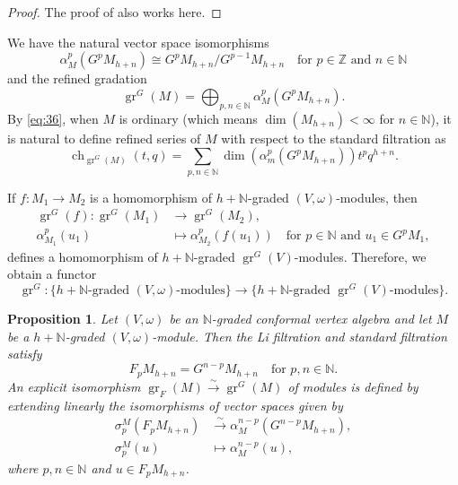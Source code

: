 \documentclass[a4paper, 12pt, reqno]{amsart}
\newtheorem{proposition}[theorem]{Proposition}
\theoremstyle{remark}
\numberwithin{equation}{subsection}
\DeclareMathOperator{\gr}{gr}
\DeclareMathOperator{\ch}{ch}
\begin{document}
\begin{proof}
  The proof of  also works here.
\end{proof}

We have the natural vector space isomorphisms
\begin{equation*}
  \alpha_M^p(G^pM_{h + n}) \cong G^pM_{h + n}/G^{p - 1}M_{h + n} \quad \text{for }p \in \mathbb{Z}\text{ and }n \in \mathbb{N}
\end{equation*}
and the refined gradation
\begin{equation}
  \label{eq:36}
  \gr^G(M) = \bigoplus_{p, n \in \mathbb{N}}\alpha_M^p(G^pM_{h + n}).
\end{equation}
By \eqref{eq:36}, when $M$ is ordinary (which means $\dim(M_{h + n}) < \infty$ for $n \in \mathbb{N}$), it is natural to define refined series of $M$ with respect to the standard filtration as
\begin{equation*}
  \ch_{\gr^G(M)}(t, q) = \sum_{p, n \in \mathbb{N}}\dim(\alpha_m^p(G^pM_{h + n}))t^pq^{h + n}.
\end{equation*}

If $f: M_1 \to M_2$ is a homomorphism of $h + \mathbb{N}$-graded $(V, \omega)$-modules, then
\begin{align*}
  \gr^G(f): \gr^G(M_1) &\to \gr^G(M_2), \\
  \alpha^p_{M_1}(u_1) &\mapsto \alpha^p_{M_2}(f(u_1)) \quad \text{for }p \in \mathbb{N}\text{ and }u_1 \in G^pM_1,
\end{align*}
defines a homomorphism of $h + \mathbb{N}$-graded $\gr^G(V)$-modules.
Therefore, we obtain a functor
\begin{equation*}
  \gr^G: \{\text{$h + \mathbb{N}$-graded $(V, \omega)$-modules}\} \to \{\text{$h + \mathbb{N}$-graded $\gr^G(V)$-modules}\}.
\end{equation*}

\begin{proposition}
  \label{prp:14}
  Let $(V, \omega)$ be an $\mathbb{N}$-graded conformal vertex algebra and let $M$ be a $h + \mathbb{N}$-graded $(V, \omega)$-module.
  Then the Li filtration and standard filtration satisfy
  \begin{equation*}
    F_pM_{h + n} = G^{n - p}M_{h + n} \quad \text{for }p, n \in \mathbb{N}.
  \end{equation*}
  An explicit isomorphism $\gr_F(M) \xrightarrow{\sim} \gr^G(M)$ of modules is defined by extending linearly the isomorphisms of vector spaces given by
  \begin{align*}
    \sigma^M_p(F_pM_{h + n}) &\xrightarrow{\sim} \alpha^{n - p}_M(G^{n - p}M_{h + n}), \\
    \sigma^M_p(u) &\mapsto \alpha^{n - p}_M(u),
  \end{align*}
  where $p, n \in \mathbb{N}$ and $u \in F_pM_{h + n}$.
\end{proposition}
\end{document}
